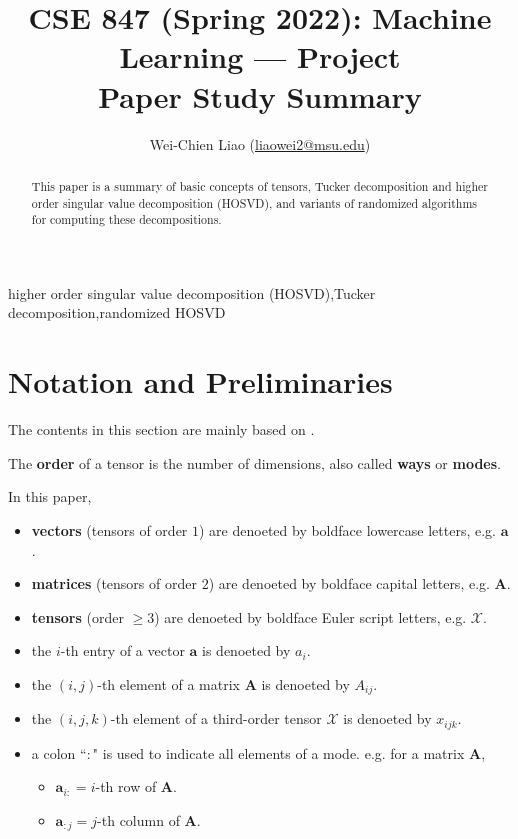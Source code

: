 \documentclass[final]{elsarticle}
\title{\textbf{\large{CSE 847 (Spring 2022): Machine Learning --- Project \\ Paper Study Summary}}}
\author{Wei-Chien Liao (\href{mailto:liaowei2@msu.edu}{liaowei2@msu.edu})}
\date{}
\begin{document}
\begin{frontmatter}
\begin{abstract}
    This paper is a summary of basic concepts of tensors, Tucker decomposition and higher order singular value decomposition (HOSVD), and variants
    of randomized algorithms for computing these decompositions.
\end{abstract}
\begin{keyword}
    higher order singular value decomposition (HOSVD)\sep Tucker decomposition\sep randomized HOSVD
\end{keyword}
\end{frontmatter}
\section{Notation and Preliminaries}
\noindent The contents in this section are mainly based on \cite{Kolda2009}.
\begin{defn}
    The \textbf{order} of a tensor is the number of dimensions, also called \textbf{ways} or \textbf{modes}.
\end{defn}
In this paper,
\begin{itemize}
    \item \textbf{vectors} (tensors of order $1$) are denoeted by boldface lowercase letters, e.g. $\mathbf{a}$.
    \item \textbf{matrices} (tensors of order $2$) are denoeted by boldface capital letters, e.g. $\mathbf{A}$.
    \item \textbf{tensors} (order $\geq 3$) are denoeted by boldface Euler script letters, e.g. $\boldsymbol{\mathscr{X}}$.
    \item the $i$-th entry of a vector $\mathbf{a}$ is denoeted by $a_i$.
    \item the $(i,j)$-th element of a matrix $\mathbf{A}$ is denoeted by $A_{ij}$.
    \item the $(i,j,k)$-th element of a third-order tensor $\boldsymbol{\mathscr{X}}$ is denoeted by $x_{ijk}$.
    \item a colon ``$:$" is used to indicate all elements of a mode. e.g. for a matrix $\mathbf{A}$,
    \begin{itemize}
        \item $\mathbf{a}_{i:} = i$-th row of $\mathbf{A}$.
        \item $\mathbf{a}_{:j} = j$-th column of $\mathbf{A}$.
    \end{itemize}
\end{itemize}
\end{document}
